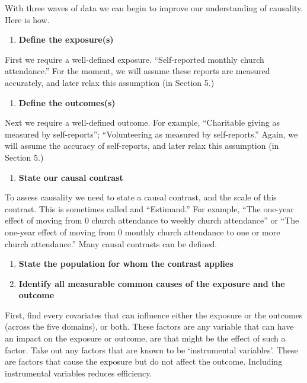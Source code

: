 \documentclass[
  singlecolumn]{report}
\providecommand{\tightlist}{%
  \setlength{\itemsep}{0pt}\setlength{\parskip}{0pt}}\usepackage{longtable,booktabs,array}
\begin{document}
With three waves of data we can begin to improve our understanding of
causality. Here is how.

\begin{enumerate}
\def\labelenumi{\arabic{enumi}.}
\tightlist
\item
  \textbf{Define the exposure(s)}
\end{enumerate}

First we require a well-defined exposure. ``Self-reported monthly church
attendance.'' For the moment, we will assume these reports are measured
accurately, and later relax this assumption (in Section 5.)

\begin{enumerate}
\def\labelenumi{\arabic{enumi}.}
\setcounter{enumi}{1}
\tightlist
\item
  \textbf{Define the outcomes(s)}
\end{enumerate}

Next we require a well-defined outcome. For example, ``Charitable giving
as measured by self-reports''; ``Volunteering as measured by
self-reports.'' Again, we will assume the accuracy of self-reports, and
later relax this assumption (in Section 5.)

\begin{enumerate}
\def\labelenumi{\arabic{enumi}.}
\setcounter{enumi}{2}
\tightlist
\item
  \textbf{State our causal contrast}
\end{enumerate}

To assess causality we need to state a causal contrast, and the scale of
this contrast. This is sometimes called and ``Estimand.'' For example,
``The one-year effect of moving from 0 church attendance to weekly
church attendance'' or ``The one-year effect of moving from 0 monthly
church attendance to one or more church attendance.'' Many causal
contrasts can be defined.

\begin{enumerate}
\def\labelenumi{\arabic{enumi}.}
\setcounter{enumi}{3}
\item
  \textbf{State the population for whom the contrast applies}
\item
  \textbf{Identify all measurable common causes of the exposure and the
  outcome}
\end{enumerate}

First, find every covariates that can influence either the exposure or
the outcomes (across the five domains), or both. These factors are any
variable that can have an impact on the exposure or outcome, are that
might be the effect of such a factor. Take out any factors that are
known to be `instrumental variables'. These are factors that cause the
exposure but do not affect the outcome. Including instrumental variables
reduces efficiency.
\end{document}
